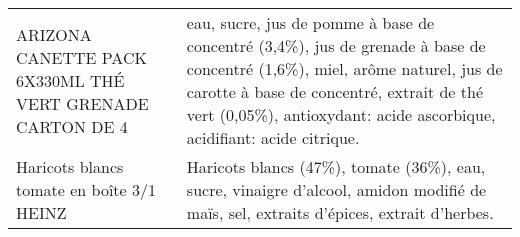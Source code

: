 \begin{longtable}{p{5cm}p{10cm}}
                                                ARIZONA CANETTE PACK 6X330ML THÉ VERT GRENADE CARTON DE 4 &                                                                                                                                                                                                                                                                                                                                                                                                                                                                                                                                                                                                                                                                                                                                                                                         eau, sucre, jus de pomme à base de concentré (3,4\%), jus de grenade à base de concentré (1,6\%), miel, arôme naturel, jus de carotte à base de concentré, extrait de thé vert (0,05\%), antioxydant: acide ascorbique, acidifiant: acide citrique. \\
                                                                Haricots blancs tomate en boîte 3/1 HEINZ &                                                                                                                                                                                                                                                                                                                                                                                                                                                                                                                                                                                                                                                                                                                                                                                                                                                                                                    Haricots blancs (47\%), tomate (36\%), eau, sucre, vinaigre d'alcool, amidon modifié de maïs, sel, extraits d'épices, extrait d'herbes. \\

\end{longtable}
